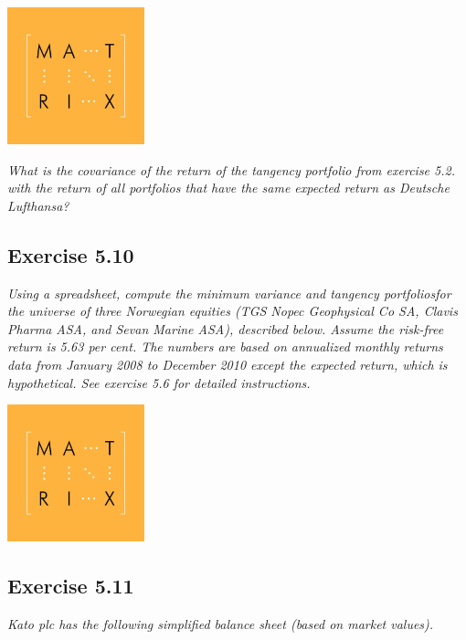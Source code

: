 \documentclass[]{book}
\theoremstyle{definition}
\theoremstyle{definition}
\theoremstyle{remark}
\begin{document}
\begin{center}\includegraphics[width=150px]{figures/matrix} \end{center}

\emph{What is the covariance of the return of the tangency portfolio
from exercise 5.2. with the return of all portfolios that have the same
expected return as Deutsche Lufthansa?} \citep[p.160]{book}

\subsection{Exercise 5.10}\label{exercise-5.10}

\emph{Using a spreadsheet, compute the minimum variance and tangency
portfoliosfor the universe of three Norwegian equities (TGS Nopec
Geophysical Co SA, Clavis Pharma ASA, and Sevan Marine ASA), described
below. Assume the risk-free return is 5.63 per cent. The numbers are
based on annualized monthly returns data from January 2008 to December
2010 except the expected return, which is hypothetical. See exercise 5.6
for detailed instructions.} \citep[p.160]{book}

\begin{center}\includegraphics[width=150px]{figures/matrix} \end{center}

\subsection{Exercise 5.11}\label{exercise-5.11}

\emph{Kato plc has the following simplified balance sheet (based on
market values).} \citep[p.160]{book}
\end{document}

